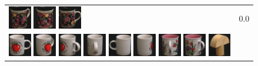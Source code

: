 \begin{figure}[tbp]
\begin{center}
\begin{tabular}{m{11cm} | m{3cm} |}
\includegraphics[width=1cm]{coil/beeld-63.eps}
\includegraphics[width=1cm]{coil/beeld-62.eps}
\includegraphics[width=1cm]{coil/beeld-60.eps}
& {\scriptsize 0.0}
\\
\includegraphics[width=1cm]{coil/beeld-36.eps}
\includegraphics[width=1cm]{coil/beeld-39.eps}
\includegraphics[width=1cm]{coil/beeld-40.eps}
\includegraphics[width=1cm]{coil/beeld-41.eps}
\includegraphics[width=1cm]{coil/beeld-37.eps}
\includegraphics[width=1cm]{coil/beeld-38.eps}
\includegraphics[width=1cm]{coil/beeld-11.eps}
\includegraphics[width=1cm]{coil/beeld-10.eps}
\includegraphics[width=1cm]{coil/beeld-3.eps}

\end{tabular}
\end{center}
\end{figure}
